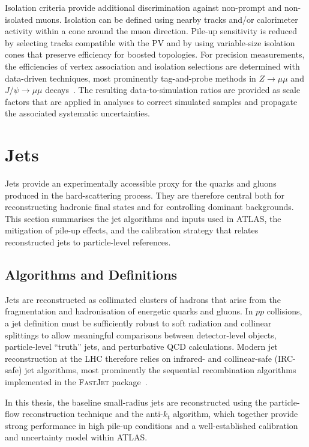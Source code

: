 Isolation criteria provide additional discrimination against non-prompt and
non-isolated muons.
Isolation can be defined using nearby tracks and/or calorimeter activity within a
cone around the muon direction.
Pile-up sensitivity is reduced by selecting tracks compatible with the PV and by
using variable-size isolation cones that preserve efficiency for boosted
topologies.
For precision measurements, the efficiencies of vertex association and isolation
selections are determined with data-driven techniques, most prominently
tag-and-probe methods in $Z\to\mu\mu$ and $J/\psi\to\mu\mu$ decays~\cite{ATLASMuonReco2021}.
The resulting data-to-simulation ratios are provided as scale factors that are
applied in analyses to correct simulated samples and propagate the associated
systematic uncertainties.

\section{Jets} 
Jets provide an experimentally accessible proxy for the quarks and gluons produced in the hard-scattering process. 
They are therefore central both for reconstructing hadronic final states and for controlling dominant backgrounds. 
This section summarises the jet algorithms and inputs used in ATLAS, the mitigation of pile-up effects, and the calibration strategy that relates reconstructed jets to particle-level references. 

\subsection{Algorithms and Definitions} 
Jets are reconstructed as collimated clusters of hadrons that arise from the fragmentation and hadronisation of energetic quarks and gluons. 
In $pp$ collisions, a jet definition must be sufficiently robust to soft radiation and collinear splittings to allow meaningful comparisons between detector-level objects, 
particle-level ``truth'' jets, and perturbative QCD calculations. 
Modern jet reconstruction at the LHC therefore relies on infrared- and collinear-safe (IRC-safe) jet algorithms, 
most prominently the sequential recombination algorithms implemented in the \textsc{FastJet} package~\cite{Cacciari2012FastJet}. 

In this thesis, the baseline small-radius jets are reconstructed using the particle-flow reconstruction technique and the anti-$k_t$ algorithm, 
which together provide strong performance in high pile-up conditions and a well-established calibration and uncertainty model within ATLAS. 

